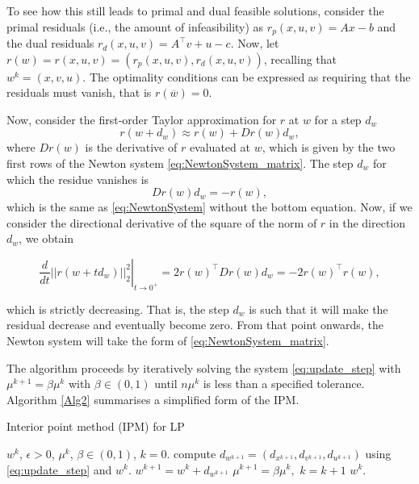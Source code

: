 To see how this still leads to primal and dual feasible solutions, consider the primal residuals (i.e., the amount of infeasibility) as $r_p(x,u,v) = Ax- b$ and the dual residuals $r_d(x,u,v) = A^\top v + u - c$. Now, let $r (w) = r(x,u,v) = (r_p(x,u,v), r_d(x,u,v))$, recalling that  $w^k = (x, v, u)$. The optimality conditions can be expressed as requiring that the residuals must vanish, that is $r(\overline{w}) = 0$.

Now, consider the first-order Taylor approximation for $r$ at $w$ for a step $d_w$
$$
r(w + d_w) \approx r(w) + Dr(w)d_w,
$$
where $Dr(w)$ is the derivative of $r$ evaluated at $w$, which is given by the two first rows of the Newton system \eqref{eq:NewtonSystem_matrix}. The step $d_w$ for which the residue vanishes is
%
\begin{equation}
	Dr(w) d_w = -r(w) \label{eq:Newton_step_residual},	
\end{equation}
%
which is the same as \eqref{eq:NewtonSystem} without the bottom equation. Now, if we consider the directional derivative of the square of the norm of $r$ in the direction $d_w$, we obtain

\begin{equation}
	\left. \frac{d}{dt} || r(w + td_w) ||_2^2 \right|_{t \rightarrow 0^+} = 2r(w)^\top Dr(w)d_w = -2 r(w)^\top r(w),
\end{equation}

which is strictly decreasing. That is, the step $d_w$ is such that it will make the residual decrease and eventually become zero. From that point onwards, the Newton system will take the form of \eqref{eq:NewtonSystem_matrix}.

 
The algorithm proceeds by iteratively solving the system \eqref{eq:update_step} with $\mu^{k+1} = \beta\mu^{k}$ with $\beta \in (0,1)$ until $n\mu^{k}$ is less than a specified tolerance. Algorithm \ref{Alg2} summarises a simplified form of the IPM.
%
\begin{algorithm}[H]
\caption{Interior point method (IPM) for LP} \label{Alg2}
\begin{algorithmic}[1] %
 $w^k$, $\epsilon > 0$, $\mu^k$, $\beta \in (0,1)$, $k = 0$. 
    \State compute $d_{w^{k+1}} = (d_{x^{k+1}}, d_{v^{k+1}}, d_{u^{k+1}})$ using \eqref{eq:update_step} and $w^k$. \label{alg:step_direction}
    \State $w^{k+1} = w^k + d_{w^{k+1}}$ \label{alg:w_update}
    \State $\mu^{k+1} = \beta\mu^k,$ $k = k+1$ 
\EndWhile
{} $w^k$.
\end{algorithmic}
\end{algorithm}

